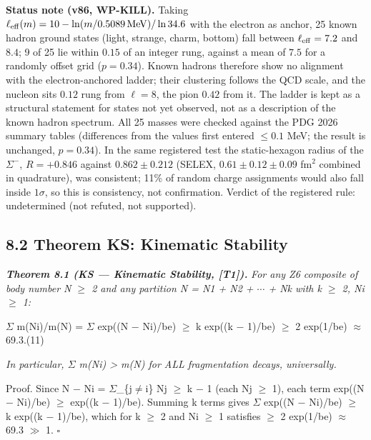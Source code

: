 \documentclass[11pt,letterpaper]{article}
\begin{document}
\noindent \textbf{Status note (v86, WP-KILL).} Taking $\ell_{\rm eff}(m)=10-\ln(m/0.5089\,{\rm MeV})/\ln34.6$ with the electron as anchor, 25 known hadron ground states (light, strange, charm, bottom) fall between $\ell_{\rm eff}=7.2$ and $8.4$; 9 of 25 lie within $0.15$ of an integer rung, against a mean of $7.5$ for a randomly offset grid ($p=0.34$). Known hadrons therefore show no alignment with the electron-anchored ladder; their clustering follows the QCD scale, and the nucleon sits $0.12$ rung from $\ell=8$, the pion $0.42$ from it. The ladder is kept as a structural statement for states not yet observed, not as a description of the known hadron spectrum. All 25 masses were checked against the PDG 2026 summary tables (differences from the values first entered $\le0.1$ MeV; the result is unchanged, $p=0.34$). In the same registered test the static-hexagon radius of the $\Sigma^-$, $R=+0.846$ against $0.862\pm0.212$ (SELEX, $0.61\pm0.12\pm0.09$ fm$^2$ combined in quadrature), was consistent; 11\% of random charge assignments would also fall inside $1\sigma$, so this is consistency, not confirmation. Verdict of the registered rule: undetermined (not refuted, not supported).

\subsection*{8.2  Theorem KS: Kinematic Stability}

\noindent \textbf{\textit{Theorem 8.1 (KS --- Kinematic Stability, [T1]). }}\textit{For any Z6 composite of body number N $\ge$ 2 and any partition N = N1 + N2 + $\cdots$ + Nk with k $\ge$ 2, Ni $\ge$ 1:}

\begingroup\centering $\Sigma$ m(Ni)/m(N) = $\Sigma$ exp((N $-$ Ni)/be) $\ge$ k exp((k $-$ 1)/be) $\ge$ 2 exp(1/be) $\approx$ 69.3.\hspace{2em}(11)\par\endgroup

\noindent \textit{In particular, $\Sigma$ m(Ni) > m(N) for ALL fragmentation decays, universally.}

\noindent Proof. Since N $-$ Ni = $\Sigma$\_\{j$\ne$i\} Nj $\ge$ k $-$ 1 (each Nj $\ge$ 1), each term exp((N $-$ Ni)/be) $\ge$ exp((k $-$ 1)/be). Summing k terms gives $\Sigma$ exp((N $-$ Ni)/be) $\ge$ k exp((k $-$ 1)/be), which for k $\ge$ 2 and Ni $\ge$ 1 satisfies $\ge$ 2 exp(1/be) $\approx$ 69.3 $\gg$ 1. $\square$
\end{document}
